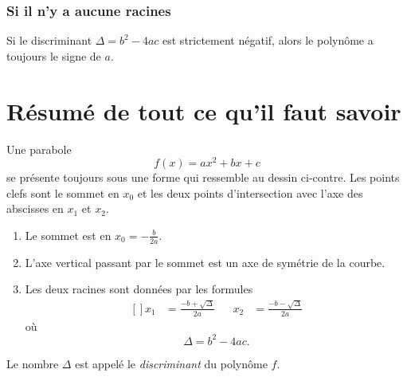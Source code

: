 \subsubsection{Si il n'y a aucune racines}

\begin{Aretenir}
    Si le discriminant \( \Delta=b^2-4ac\) est strictement négatif, alors le polynôme a toujours le signe de \( a\).
\end{Aretenir}

\section{Résumé de tout ce qu'il faut savoir}

\begin{multicols}{2}
Une parabole
\begin{equation*}
    f(x)=ax^2+bx+c
\end{equation*}
se présente toujours sous une forme qui ressemble au dessin ci-contre. Les points clefs sont le sommet en \( x_0\) et les deux points d'intersection avec l'axe des abscisses en \( x_1\) et \( x_2\).

\begin{enumerate}
    \item
        Le sommet est en \( x_0=-\frac{ b }{ 2a }\).

    \item
L'axe vertical passant par le sommet est un axe de symétrie de la courbe.
\item

Les deux racines sont données par les formules
\begin{equation*}
    \begin{aligned}[]
        x_1&=\frac{ -b+\sqrt{\Delta} }{ 2a }&&x_2&=\frac{ -b-\sqrt{\Delta} }{ 2a }
    \end{aligned}
\end{equation*}
où
\begin{equation*}
    \Delta=b^2-4ac.
\end{equation*}
\end{enumerate}

\columnbreak
\begin{center}

\end{center}
\end{multicols}
Le nombre \( \Delta\) est appelé le \emph{discriminant} du polynôme \( f\).

